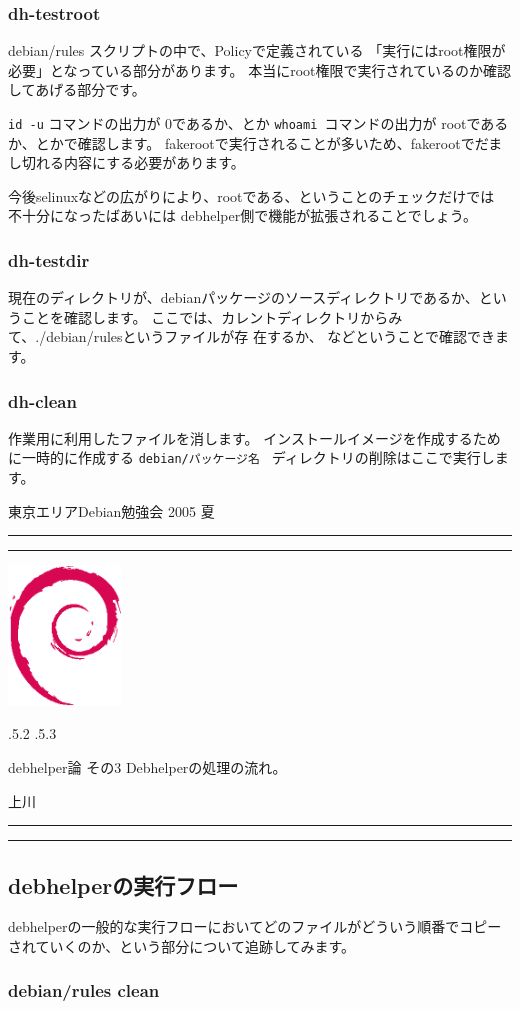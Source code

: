 \documentclass[mingoth,a4paper]{jsarticle}
\makeatletter
\renewcommand{\section}{\@startsection{section}{1}{\z@}%
    {\Cvs \@plus.5\Cdp \@minus.2\Cdp}%
    {.5\Cvs \@plus.3\Cdp}%
    {\normalfont\Large\headfont\raggedright\centering}} %
\newcommand{\dancersection}[2]{%
\newpage
東京エリアDebian勉強会 2005 夏
\hrule
\vspace{0.5mm}
\hrule
\hfill{}\includegraphics[width=3cm]{image200502/openlogo-nd.eps}\\
\vspace{-4cm}
\begin{center}
  \section{#1}
\end{center}
\hfill{}#2\hspace{3cm}\space\\
\hrule
\hrule
\vspace{1cm}
}
\makeatother
\begin{document}
\subsubsection{dh-testroot}

debian/rules スクリプトの中で、Policyで定義されている
「実行にはroot権限が必要」となっている部分があります。
本当にroot権限で実行されているのか確認してあげる部分です。

{\tt id -u}  コマンドの出力が 0であるか、とか
{\tt whoami }コマンドの出力が rootであるか、とかで確認します。
fakerootで実行されることが多いため、fakerootでだまし切れる内容にする必要があります。

今後selinuxなどの広がりにより、rootである、ということのチェックだけでは
不十分になったばあいには
debhelper側で機能が拡張されることでしょう。

\subsubsection{dh-testdir}

現在のディレクトリが、debianパッケージのソースディレクトリであるか、とい
うことを確認します。
ここでは、カレントディレクトリからみて、./debian/rulesというファイルが存
在するか、
などということで確認できます。

\subsubsection{dh-clean}

作業用に利用したファイルを消します。
インストールイメージを作成するために一時的に作成する
{\tt debian/パッケージ名 } ディレクトリの削除はここで実行します。




\newpage

\dancersection{debhelper論 その3 Debhelperの処理の流れ。}{上川}

\subsection{debhelperの実行フロー}

debhelperの一般的な実行フローにおいてどのファイルがどういう順番でコピー
されていくのか、という部分について追跡してみます。

\subsubsection{debian/rules clean}
\end{document}
